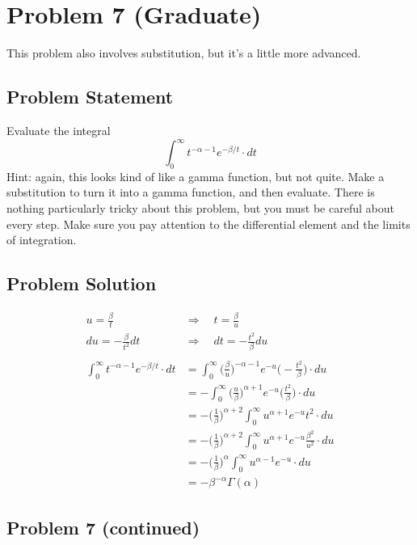 \documentclass[12pt]{article}
\theoremstyle{definition}
\begin{document}
\newpage
\section*{Problem 7 (Graduate)}

This problem also involves substitution, but it's a little more advanced.

\subsection*{Problem Statement}

Evaluate the integral
$$
\int_0^\infty t^{-\alpha- 1} e^{-\beta/t} \cdot dt
$$
Hint: again, this looks kind of like a gamma function, but not quite. Make a substitution to turn it into a gamma function, and then evaluate. There is nothing particularly tricky about this problem, but you must be careful about every step. Make sure you pay attention to the differential element and the limits of integration.

\subsection*{Problem Solution}
\begin{align*}
u = \frac{\beta}{t} \quad&\Rightarrow\quad t = \frac{\beta}{u}\\
du = -\frac{\beta}{t^2} dt \quad&\Rightarrow\quad dt = -\frac{t^2}{\beta}du\\\\
\int_0^\infty t^{-\alpha- 1} e^{-\beta/t} \cdot dt &= \int_0^\infty \biggr(\frac{\beta}{u}\biggr)^{-\alpha - 1}e^{-u} \biggr(-\frac{t^2}{\beta}\biggr) \cdot du\\
&= - \int_0^\infty \biggr(\frac{u}{\beta}\biggr)^{\alpha + 1} e^{-u} \biggr(\frac{t^2}{\beta}\biggr) \cdot du\\
& = -\biggr(\frac{1}{\beta}\biggr)^{\alpha + 2} \int_0^\infty u^{\alpha + 1} e^{-u} t^2 \cdot du\\
& = -\biggr(\frac{1}{\beta}\biggr)^{\alpha + 2} \int_0^\infty u^{\alpha + 1} e^{-u} \frac{\beta^2}{u^2} \cdot du\\
& = -\biggr(\frac{1}{\beta}\biggr)^{\alpha} \int_0^\infty u^{\alpha - 1} e^{-u} \cdot du\\
& = -\beta^{-\alpha}\Gamma(\alpha)
\end{align*}


\newpage
\subsection*{Problem 7 (continued)}
\end{document}
